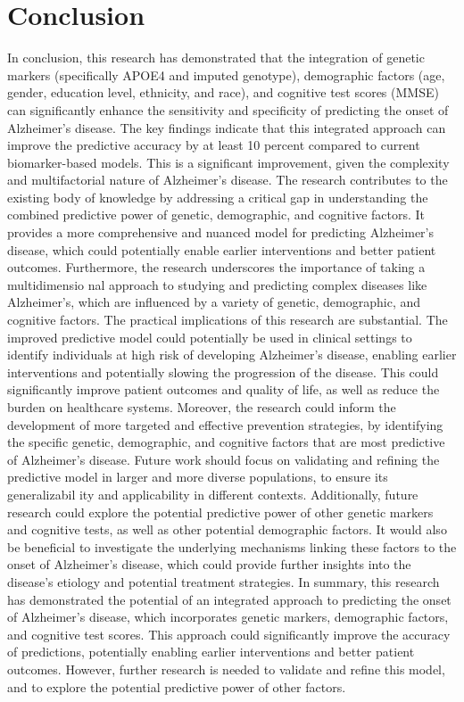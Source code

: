 \documentclass[conference]{IEEEtran}
\begin{document}
\section{Conclusion}
In conclusion, this research has demonstrated that the integration of genetic markers (specifically APOE4 and imputed genotype), demographic factors (age, gender, education level, ethnicity, and race), and cognitive test scores (MMSE) can significantly enhance the sensitivity and specificity of predicting the onset of Alzheimer's disease. The key findings indicate that this integrated approach can improve the predictive accuracy by at least 10 percent compared to current biomarker-based models. This is a significant improvement, given the complexity and multifactorial nature of Alzheimer's disease. The research contributes to the existing body of knowledge by addressing a critical gap in understanding the combined predictive power of genetic, demographic, and cognitive factors. It provides a more comprehensive and nuanced model for predicting Alzheimer's disease, which could potentially enable earlier interventions and better patient outcomes. Furthermore, the research underscores the importance of taking a multidimensio nal approach to studying and predicting complex diseases like Alzheimer's, which are influenced by a variety of genetic, demographic, and cognitive factors. The practical implications of this research are substantial. The improved predictive model could potentially be used in clinical settings to identify individuals at high risk of developing Alzheimer's disease, enabling earlier interventions and potentially slowing the progression of the disease. This could significantly improve patient outcomes and quality of life, as well as reduce the burden on healthcare systems. Moreover, the research could inform the development of more targeted and effective prevention strategies, by identifying the specific genetic, demographic, and cognitive factors that are most predictive of Alzheimer's disease. Future work should focus on validating and refining the predictive model in larger and more diverse populations, to ensure its generalizabil ity and applicability in different contexts. Additionally, future research could explore the potential predictive power of other genetic markers and cognitive tests, as well as other potential demographic factors. It would also be beneficial to investigate the underlying mechanisms linking these factors to the onset of Alzheimer's disease, which could provide further insights into the disease's etiology and potential treatment strategies. In summary, this research has demonstrated the potential of an integrated approach to predicting the onset of Alzheimer's disease, which incorporates genetic markers, demographic factors, and cognitive test scores. This approach could significantly improve the accuracy of predictions, potentially enabling earlier interventions and better patient outcomes. However, further research is needed to validate and refine this model, and to explore the potential predictive power of other factors.
\end{document}
